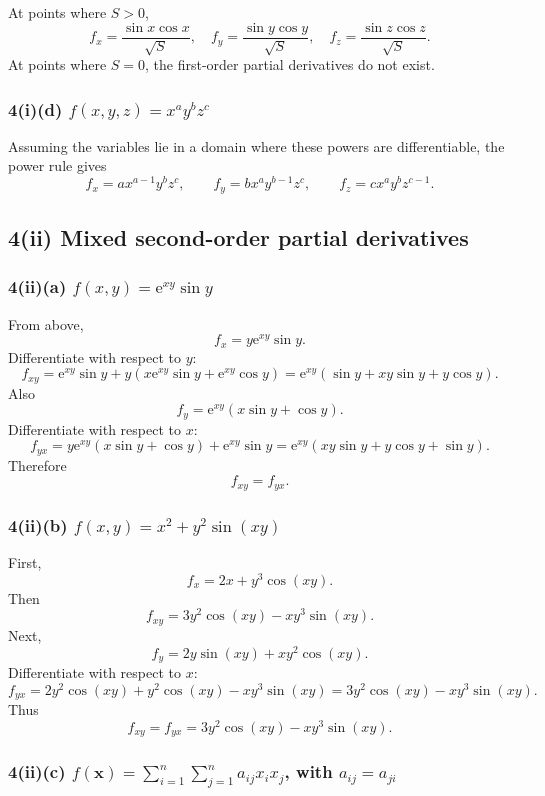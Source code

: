 \documentclass[11pt]{article}
\newcommand{\e}{\mathrm e}
\begin{document}
\begin{answerbox}
At points where \(S>0\),
\[
\boxed{f_x=\frac{\sin x\cos x}{\sqrt S},\quad
f_y=\frac{\sin y\cos y}{\sqrt S},\quad
f_z=\frac{\sin z\cos z}{\sqrt S}.}
\]
At points where \(S=0\), the first-order partial derivatives do not exist.
\end{answerbox}

\subsubsection*{4(i)(d) \(f(x,y,z)=x^ay^bz^c\)}

Assuming the variables lie in a domain where these powers are differentiable, the power rule gives
\[
f_x=a x^{a-1}y^bz^c,
\qquad
f_y=b x^ay^{b-1}z^c,
\qquad
f_z=c x^ay^bz^{c-1}.
\]

\subsection{4(ii) Mixed second-order partial derivatives}

\subsubsection*{4(ii)(a) \(f(x,y)=\e^{xy}\sin y\)}

From above,
\[
f_x=y\e^{xy}\sin y.
\]
Differentiate with respect to \(y\):
\[
f_{xy}
=\e^{xy}\sin y+y\left(x\e^{xy}\sin y+\e^{xy}\cos y\right)
=\e^{xy}\left(\sin y+xy\sin y+y\cos y\right).
\]
Also
\[
f_y=\e^{xy}(x\sin y+\cos y).
\]
Differentiate with respect to \(x\):
\[
f_{yx}=y\e^{xy}(x\sin y+\cos y)+\e^{xy}\sin y
=\e^{xy}\left(xy\sin y+y\cos y+\sin y\right).
\]
Therefore
\[
\boxed{f_{xy}=f_{yx}.}
\]

\subsubsection*{4(ii)(b) \(f(x,y)=x^2+y^2\sin(xy)\)}

First,
\[
f_x=2x+y^3\cos(xy).
\]
Then
\[
f_{xy}=3y^2\cos(xy)-xy^3\sin(xy).
\]
Next,
\[
f_y=2y\sin(xy)+xy^2\cos(xy).
\]
Differentiate with respect to \(x\):
\[
f_{yx}=2y^2\cos(xy)+y^2\cos(xy)-xy^3\sin(xy)
=3y^2\cos(xy)-xy^3\sin(xy).
\]
Thus
\[
\boxed{f_{xy}=f_{yx}=3y^2\cos(xy)-xy^3\sin(xy).}
\]

\subsubsection*{4(ii)(c) \(\displaystyle f(\mathbf x)=\sum_{i=1}^n\sum_{j=1}^n a_{ij}x_ix_j\), with \(a_{ij}=a_{ji}\)}
\end{document}
